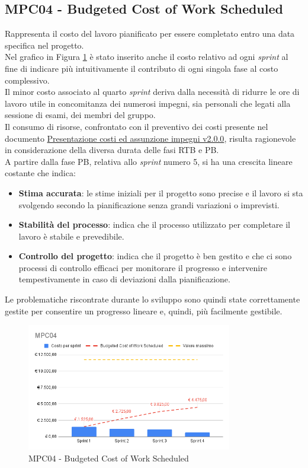 \subsection{MPC04 - Budgeted Cost of Work Scheduled}
\label{s:mpc04}
Rappresenta il costo del lavoro pianificato per essere completato entro una data specifica nel progetto.\\
Nel grafico in Figura \ref{fig:mpc04} è stato inserito anche il costo relativo ad ogni \textit{sprint} al fine di indicare più intuitivamente il contributo di ogni singola fase al costo complessivo.\\
Il minor costo associato al quarto \textit{sprint} deriva dalla necessità di ridurre le ore di lavoro utile in concomitanza dei numerosi impegni, sia personali che legati alla sessione di esami, dei membri del gruppo.\\
Il consumo di risorse, confrontato con il preventivo dei costi presente nel documento \href{https://project-swenergy.github.io/Candidatura/Presentazione%20costi%20e%20assunzione%20impegni.pdf}{Presentazione costi ed assunzione impegni v2.0.0}, risulta ragionevole in considerazione della diversa durata delle fasi RTB e PB.\\
A partire dalla fase PB, relativa allo \textit{sprint} numero 5, si ha una crescita lineare costante che indica:
\begin{itemize}
    \item \textbf{Stima accurata}: le stime iniziali per il progetto sono precise e il lavoro si sta svolgendo secondo la pianificazione senza grandi variazioni o imprevisti.
    \item \textbf{Stabilità del processo}: indica che il processo utilizzato per completare il lavoro è stabile e prevedibile.
    \item \textbf{Controllo del progetto}: indica che il progetto è ben gestito e che ci sono processi di controllo efficaci per monitorare il progresso e intervenire tempestivamente in caso di deviazioni dalla pianificazione.
\end{itemize}
\vspace{1.5em}
Le problematiche riscontrate durante lo sviluppo sono quindi state correttamente gestite per consentire un progresso lineare e, quindi, più facilmente gestibile.
\begin{figure}[h]
    \centering
    \includegraphics[width=0.8\textwidth]{img/MPC04.png}
    \caption{MPC04 - Budgeted Cost of Work Scheduled}
    \label{fig:mpc04}
\end{figure}


